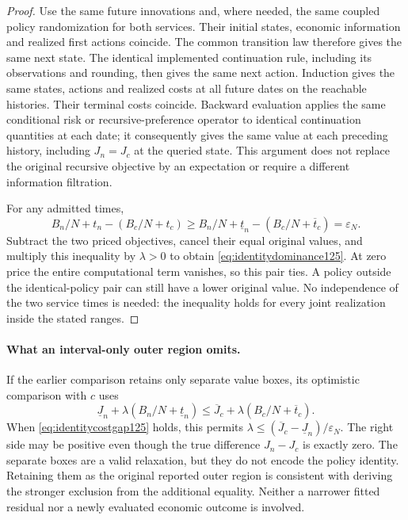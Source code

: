 \begin{proof}
Use the same future innovations and, where needed, the same coupled policy
randomization for both services. Their initial states, economic information
and realized first actions coincide. The common transition law therefore
gives the same next state. The identical implemented continuation rule,
including its observations and rounding, then gives the same next action.
Induction gives the same states, actions and realized costs at all future
dates on the reachable histories. Their terminal costs coincide. Backward
evaluation applies the same conditional risk or recursive-preference
operator to identical continuation quantities at each date; it consequently
gives the same value at each preceding history, including $J_n=J_c$ at
the queried state. This argument does not replace the original recursive
objective by an expectation or require a different information filtration.

For any admitted times,
\[
 B_n/N+t_n-(B_c/N+t_c)
 \ge B_n/N+\underline t_n-(B_c/N+\overline t_c)
 =\varepsilon_N.
\]
Subtract the two priced objectives, cancel their equal original values,
and multiply this inequality by $\lambda>0$ to obtain
\eqref{eq:identitydominance125}. At zero price the entire computational
term vanishes, so this pair ties. A policy outside the identical-policy
pair can still have a lower original value. No independence of the two
service times is needed: the inequality holds for every joint realization
inside the stated ranges.
\end{proof}

\paragraph{What an interval-only outer region omits.}
If the earlier comparison retains only separate value boxes, its
optimistic comparison with $c$ uses
\[
 \underline J_n+\lambda(B_n/N+\underline t_n)
 \le \overline J_c+\lambda(B_c/N+\overline t_c).
\]
When \eqref{eq:identitycostgap125} holds, this permits
$\lambda\le(\overline J_c-\underline J_n)/\varepsilon_N$.
The right side may be positive even though the true difference
$J_n-J_c$ is exactly zero. The separate boxes are a valid relaxation,
but they do not encode the policy identity. Retaining them as the original
reported outer region is consistent with deriving the stronger exclusion
from the additional equality. Neither a narrower fitted residual nor a
newly evaluated economic outcome is involved.

